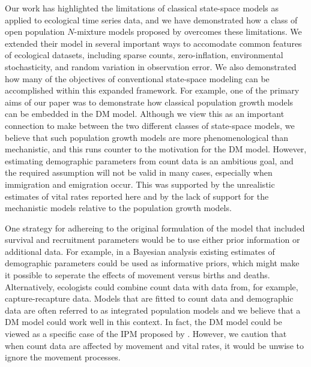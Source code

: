 \documentclass[12pt]{article}
\begin{document}
Our work has highlighted the limitations of classical state-space
models as applied to ecological time series data, and we have
demonstrated how a class of open population $N$-mixture models
proposed by \citet{dail_madsen:2011} overcomes these
limitations. We extended their model in several important
ways to accomodate common features of ecological
datasets, including sparse counts, zero-inflation, environmental
stochasticity, and random variation in observation error.
We also demonstrated how many of the objectives of conventional
state-space modeling can be accomplished within this expanded
framework. For example, one of the primary aims of our paper was to demonstrate how classical
population growth models can be embedded in the DM model.
Although we view this as an important connection to make between the two
different classes of state-space models, we believe that
such population growth models are more phenomenological
than mechanistic, and this runs counter to the motivation for
the DM model. However, estimating
demographic parameters from count data is an ambitious goal, and
the required assumption will not be valid in many cases,
especially when immigration and emigration occur. This was supported by the
unrealistic estimates of vital rates reported here and by the
lack of support for the mechanistic models relative to the population
growth models.

One strategy for adhereing to the original formulation of the
model that included survival and recruitment parameters would be to
use either prior information or additional data. For example, in a
Bayesian analysis existing estimates of demographic parameters
could be used as informative priors, which might make it possible to
seperate the effects of movement versus births and deaths.
Alternatively, ecologists could combine count data with data
from, for example,
capture-recapture data. Models that are fitted to count data and
demographic data are often referred to as integrated population models
\citep[IPM;][]{besbeas_etal:2002,
buckland_etal:2004,schaub_etal:2007}
and we believe that a DM model could work well in this context.
In fact, the DM model could be viewed as a specific case of the
IPM proposed by \citet{buckland_etal:2004}.
However, we caution that when count data are affected by
movement and vital rates, it would be unwise to ignore the movement
processes.
\end{document}
